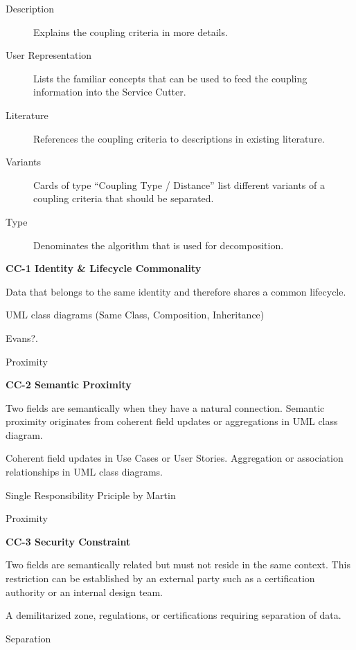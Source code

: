 \begin{description}
\item[Description] Explains the coupling criteria in more details.
\item[User Representation] Lists the familiar concepts that can be used to feed the coupling information into the Service Cutter.
\item[Literature] References the coupling criteria to descriptions in existing literature.
\item[Variants] Cards of type \enquote{Coupling Type / Distance} list different variants of a coupling criteria that should be separated.
\item[Type] Denominates the algorithm that is used for decomposition. %
\end{description}

\newcommand{\ccCard}[7] {
\begin{minipage}{\linewidth}
	\begin{framed}
	\textbf{#1 #2}
	
		\begin{description}[leftmargin=!,labelwidth=\widthof{\bfseries User Representation}]
		\item[Description] #3
		\item[User Representation] #4 %
		\ifthenelse{\equal{#5}{}}{}{\item[Variants] #5}
		\item[Literature] #6
		\item[Type] #7
		\end{description}
	
	\end{framed}
\end{minipage}
}
\ccCard{CC-1}{Identity \& Lifecycle Commonality}{Data that belongs to the same identity and therefore shares a common lifecycle.}{UML class diagrams (Same Class, Composition, Inheritance)}{}{Evans?\cite{evans2003domain}.}{Proximity}

\ccCard{CC-2}{Semantic Proximity}{Two fields are semantically when they have a natural connection. Semantic proximity originates from coherent field updates or aggregations in UML class diagram.}{Coherent field updates in Use Cases or User Stories. Aggregation or association relationships in UML class diagrams.}{}{Single Responsibility Priciple by Martin\cite{SRP}}{Proximity}

\ccCard{CC-3}{Security Constraint}{Two fields are semantically related but must not reside in the same context. This restriction can be established by an external party such as a certification authority or an internal design team.}{A demilitarized zone, regulations, or certifications requiring separation of data.}{}{}{Separation}

